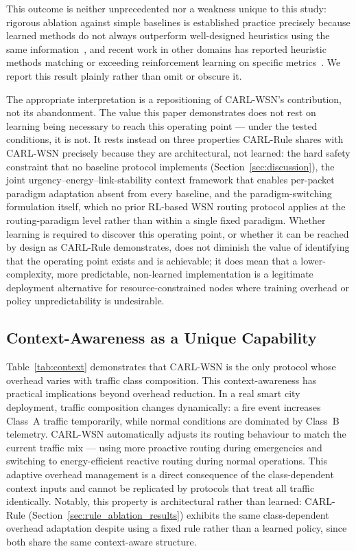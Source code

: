 \documentclass[12pt]{article}
\begin{document}
This outcome is neither unprecedented nor a weakness unique to this
study: rigorous ablation against simple baselines is established
practice precisely because learned methods do not always
outperform well-designed heuristics using the same
information~\cite{henderson2018}, and recent work in other domains
has reported heuristic methods matching or exceeding reinforcement
learning on specific
metrics~\cite{bairaktaris2025}. We report this result plainly rather
than omit or obscure it.

The appropriate interpretation is a repositioning of CARL-WSN's
contribution, not its abandonment. The value this paper demonstrates
does not rest on learning being necessary to reach this operating
point --- under the tested conditions, it is not. It rests instead on
three properties CARL-Rule shares with CARL-WSN precisely because
they are architectural, not learned: the hard safety constraint
that no baseline protocol implements (Section~\ref{sec:discussion}),
the joint urgency--energy--link-stability context framework that
enables per-packet paradigm adaptation absent from every baseline,
and the paradigm-switching formulation itself, which no prior
RL-based WSN routing protocol applies at the routing-paradigm level
rather than within a single fixed paradigm. Whether learning is
required to discover this operating point, or whether it can be
reached by design as CARL-Rule demonstrates, does not diminish the
value of identifying that the operating point exists and is
achievable; it does mean that a lower-complexity, more
predictable, non-learned implementation is a legitimate deployment
alternative for resource-constrained nodes where training overhead
or policy unpredictability is undesirable.

\subsection{Context-Awareness as a Unique Capability}

Table~\ref{tab:context} demonstrates that CARL-WSN is the only
protocol whose overhead varies with traffic class composition.
This context-awareness has practical implications beyond overhead
reduction. In a real smart city deployment, traffic composition
changes dynamically: a fire event increases Class~A traffic
temporarily, while normal conditions are dominated by Class~B
telemetry. CARL-WSN automatically adjusts its routing behaviour
to match the current traffic mix --- using more proactive routing
during emergencies and switching to energy-efficient reactive
routing during normal operations. This adaptive overhead management
is a direct consequence of the class-dependent context inputs and
cannot be replicated by protocols that treat all traffic
identically. Notably, this property is architectural rather than
learned: CARL-Rule (Section~\ref{sec:rule_ablation_results}) exhibits
the same class-dependent overhead adaptation despite using a fixed
rule rather than a learned policy, since both share the same
context-aware structure.
\end{document}

